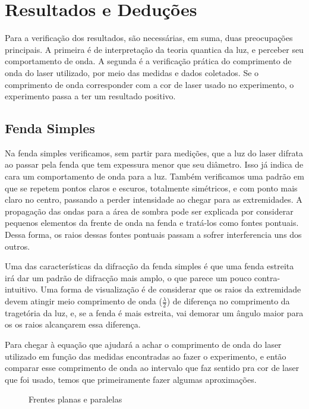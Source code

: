 \section{Resultados e Deduções}\label{result}

Para a verificação dos resultados, são necessárias, em suma, duas preocupações principais. A primeira é de interpretação da teoria quantica da luz, e perceber seu comportamento de onda. A segunda é a verificação prática do comprimento de onda do laser utilizado, por meio das medidas e dados coletados. Se o comprimento de onda corresponder com a cor de laser usado no experimento, o experimento passa a ter um resultado positivo.

\subsection{Fenda Simples}\label{fenda_simples}

Na fenda simples verificamos, sem partir para medições, que a luz do laser difrata ao passar pela fenda que tem expessura menor que seu diâmetro. Isso já indica de cara um comportamento de onda para a luz. Também verificamos uma padrão em que se repetem pontos claros e escuros, totalmente simétricos, e com ponto mais claro no centro, passando a perder intensidade ao chegar para as extremidades. A propagação das ondas para a área de sombra pode ser explicada por considerar pequenos elementos da frente de onda na fenda e tratá-los como fontes pontuais. Dessa forma, os raios dessas fontes pontuais passam a sofrer interferencia uns dos outros.

Uma das características da difracção da fenda simples é que uma fenda estreita irá dar um padrão de difracção mais amplo, o que parece um pouco contra-intuitivo. Uma forma de visualização é de considerar que os raios da extremidade devem atingir meio comprimento de onda ($\frac{\lambda}{2}$) de diferença no comprimento da tragetória da luz, e, se a fenda é mais estreita, vai demorar um ângulo maior para os os raios alcançarem essa diferença.

Para chegar à equação que ajudará a achar o comprimento de onda do laser utilizado em função das medidas encontradas ao fazer o experimento, e então comparar esse comprimento de onda ao intervalo que faz sentido pra cor de laser que foi usado, temos que primeiramente fazer algumas aproximações.

\begin{figure}[H]
\begin{center}
\end{center}
\caption{Frentes planas e paralelas}
\label{frentes}
\end{figure}

